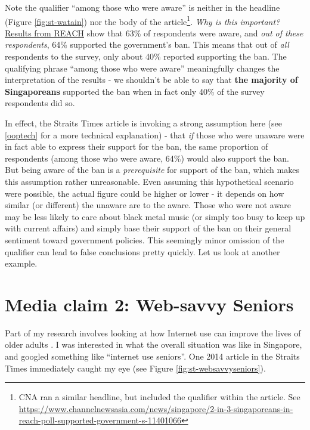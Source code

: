 \documentclass[openany]{book}
\let\rmarkdownfootnote\footnote%
\def\footnote{\protect\rmarkdownfootnote}
\begin{document}
Note the qualifier ``among those who were aware'' is neither in the
headline (Figure \ref{fig:st-watain}) nor the body of the
article\footnote{CNA ran a similar headline, but included the qualifier
  within the article. See
  \url{https://www.channelnewsasia.com/news/singapore/2-in-3-singaporeans-in-reach-poll-supported-government-s-11401066}}.
\emph{Why is this important?}
\href{https://www.reach.gov.sg/~/media/2019/press-release/findings-of-poll-on-watain-concert--1-april-2019.pdf}{Results
from REACH} show that 63\% of respondents were aware, and \emph{out of
these respondents}, 64\% supported the government's ban. This means that
out of \emph{all} respondents to the survey, only about 40\% reported
supporting the ban. The qualifying phrase ``among those who were aware''
meaningfully changes the interpretation of the results - we shouldn't be
able to say that \textbf{the majority of Singaporeans} supported the ban
when in fact only 40\% of the survey respondents did so.

In effect, the Straits Times article is invoking a strong assumption
here (see \ref{ooptech} for a more technical explanation) - that
\emph{if} those who were unaware were in fact able to express their
support for the ban, the same proportion of respondents (among those who
were aware, 64\%) would also support the ban. But being aware of the ban
is a \emph{prerequisite} for support of the ban, which makes this
assumption rather unreasonable. Even assuming this hypothetical scenario
were possible, the actual figure could be higher or lower - it depends
on how similar (or different) the unaware are to the aware. Those who
were not aware may be less likely to care about black metal music (or
simply too busy to keep up with current affairs) and simply base their
support of the ban on their general sentiment toward government
policies. This seemingly minor omission of the qualifier can lead to
false conclusions pretty quickly. Let us look at another example.

\section{Media claim 2: Web-savvy Seniors}\label{websavvy}

Part of my research involves looking at how Internet use can improve the
lives of older adults \citep[see][]{ang_going_2018}. I was interested in
what the overall situation was like in Singapore, and googled something
like ``internet use seniors''. One 2014 article in the Straits Times
immediately caught my eye (see Figure \ref{fig:st-websavvyseniors}).
\end{document}

